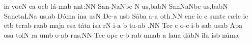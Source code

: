 \sgn {}i{}\punctum a\egn
\spatium
\sgn voc\punctum N\egn
\sgn {}e{}\punctum a\egn
\spatium
{}oc\punctum b\egn
\sgn l{\'a}{-m}\punctum a\augmentum b\egn
\sgn {}a{nt:}\punctum N\augmentum N\egn
\spatium
\divisiofinalis
\spatium
\sgn Sa{n-}\pes Na\augmentum N\nonspatium\hskip-3pt\quilismapes bc\egn
\custos N
\lineaproxima
{}u{s,}\clivis ba\augmentumduplex bN\egn
\spatium\divisiofinalis\spatium
\sgn Sa{n}\pes Na\augmentum N\nonspatium\hskip-3pt\quilismapes bc\egn
{}u{s,}\clivis ba\augmentumduplex bN\egn
\spatium\divisiofinalis\spatium
\sgn Sa{nct}\clivis aL\spatiumparvum\pes Na\egn
\sgn {}u{s,}\punctum a\augmentum b\egn
\spatium\divisiominor\spatium
\sgn D{\'o}m\punctum a\egn
\sgn {}in\punctum a\egn
\sgn {}us\punctum N\egn
\spatium\sgn De-\punctum a\egn
\sgn {}us\punctum b\egn
\spatium
\sgn S{\'a}b\punctum a\egn
\sgn {}a-\punctum a\egn
\sgn {}o{th.}\punctum N\augmentum N\egn
\spatium\divisiofinalis\spatium
{}en\punctum c\egn
\sgn {}i{}\punctum c\egn
\spatium
\custos c
\lineaproxima
%
\sgn su{nt}\punctum c\egn
\spatium\sgn c{\ae}l\punctum c\egn
\sgn {}i{}\punctum c\egn
\spatium
\sgn {}et\punctum b\egn
\spatium
\sgn ter\pes ab\egn
\sgn ra{}\punctum a\augmentum b\egn
\spatium\divisiominor\spatium
\sgn maj\punctum a\egn
\sgn {}es\punctum a\egn
\sgn t{\'a}t\punctum a\egn
\sgn {}is\punctum a\egn
\spatium
{}r\punctum N\egn
\sgn {}i-\punctum a\egn
\sgn {}{\ae}{}\punctum b\egn
\spatium
\sgn tu-\punctum a\augmentum b\egn
\sgn {}{\ae}.\punctum N\augmentum N\egn
\spatium\divisiofinalis\spatium
\sgn Te{}\punctum c\egn
\spatium
\custos c
\lineaproxima
{}o-\punctum c\egn
{}i-\punctum b\egn
{}s\pes ab\egn
\sgn {}us\punctum a\augmentum b\egn
\spatium
\divisiominor
\spatium
\sgn {}Ap\punctum a\egn
\sgn {}os\punctum a\egn
\sgn tol\punctum N\egn
{}r\punctum a\egn
\sgn {}um\punctum b\egn
\spatium{}o-\punctum a\augmentum b\egn
\sgn ru{s,}\punctum N\augmentum N\egn
\spatium\divisiofinalis\spatium
\sgn Te{}\punctum c\egn
\spatium
{}op\punctum c\egn
{}e-\punctum b\egn
{}r\pes ab\egn
\sgn {}um\punctum a\augmentum b\egn
\spatium
\divisiominor
\spatium
\custos a
\lineaproxima
\sgn lau\punctum a\egn
\sgn d{\'a}{b}\punctum N\egn
\sgn {}il\punctum a\egn
\sgn {}is\punctum b\egn
\spatium\sgn n{\'u}m\punctum a\egn
